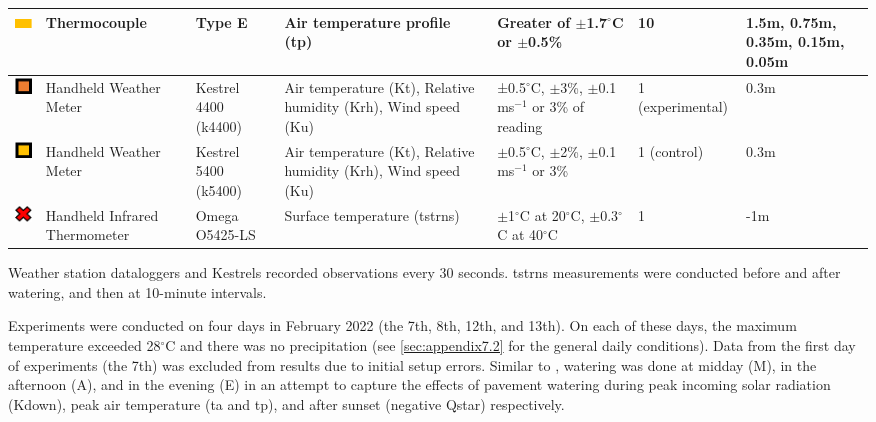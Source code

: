 \documentclass[final,3p,times,authoryear]{elsarticle}
\begin{document}
\begin{table}[!ht]
\begin{tabular}{|p{0.90cm}|p{2.0cm}|p{2.0cm}|p{3.5cm}|p{2.5cm}|p{1.0cm}|p{1.0cm}|}
\includegraphics[trim={0 0 0 0},clip,scale=0.5]{Picture6.png}&Thermocouple&Type E&Air temperature profile (\gls{tp})&Greater of $\pm$1.7$^{\circ}$C or $\pm$0.5\%&10&1.5m, 0.75m, 0.35m, 0.15m, 0.05m \\ \hline     
\includegraphics[trim={0 0 0 0},clip,scale=0.5]{Picture7.png}&Handheld Weather Meter&Kestrel 4400 (k4400)&Air temperature (\gls{Kt}), Relative humidity (\gls{Krh}), Wind speed (\gls{Ku})&±0.5$^{\circ}$C, $\pm$3\%, $\pm$0.1 ms$^{-1}$ or 3\% of reading&1 (experimental)&0.3m \\ \hline
\includegraphics[trim={0 0 0 0},clip,scale=0.5]{Picture8.png}&Handheld Weather Meter&Kestrel 5400 (k5400)&Air temperature (\gls{Kt}), Relative humidity (\gls{Krh}), Wind speed (\gls{Ku})&$\pm$0.5$^{\circ}$C, $\pm$2\%, $\pm$0.1 ms$^{-1}$ or 3\%&1 (control)&0.3m \\ \hline 
\includegraphics[trim={0 0 0 0},clip,scale=0.5]{Picture9.png}&Handheld Infrared Thermometer&Omega O5425-LS&Surface temperature (\gls{tstrns})&$\pm$1$^{\circ}$C at 20$^{\circ}$C, $\pm$0.3$^{\circ}$C at 40$^{\circ}$C&1&-1m \\ \hline           
\end{tabular}\label{table:2.1}
\end{table}

Weather station dataloggers and Kestrels recorded observations every 30 seconds. \gls{tstrns} measurements were conducted before and after watering, and then at 10-minute intervals.

Experiments were conducted on four days in February 2022 (the 7th, 8th, 12th, and 13th). On each of these days, the maximum temperature exceeded 28$^{\circ}$C and there was no precipitation (see \ref{sec:appendix7.2} for the general daily conditions). Data from the first day of experiments (the 7th) was excluded from results due to initial setup errors. Similar to \cite{Middel2021}, watering was done at midday (M), in the afternoon (A), and in the evening (E) in an attempt to capture the effects of pavement watering during peak incoming solar radiation (\gls{Kdown}), peak air temperature (\gls{ta} and \gls{tp}), and after sunset (negative \gls{Qstar}) respectively.
\end{document}
